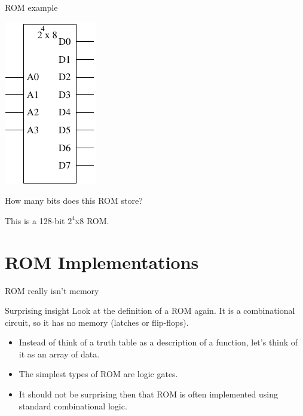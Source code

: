 \begin{frame}{ROM example}
  \begin{center}
    \includegraphics{128BitROM}
  \end{center}
  How many bits does this ROM store?
\end{frame}

This is a 128-bit $2^4$x8 ROM.

\section{ROM Implementations}

\begin{frame}{ROM really isn't memory}
  \begin{block}{Surprising insight}
    Look at the definition of a ROM again.  It is a combinational circuit, so it has no memory (latches or flip-flops).
  \end{block}
  \begin{itemize}
    \item Instead of think of a truth table as a description of a function, let's think of it as an array of data.
    \item The simplest types of ROM are logic gates.
    \item It should not be surprising then that ROM is often implemented using standard combinational logic.
  \end{itemize}
\end{frame}

